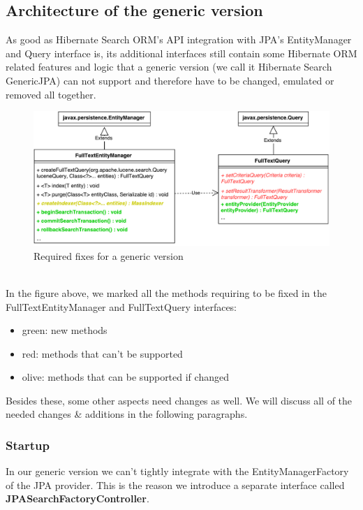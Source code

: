 \pagebreak

\subsection{Architecture of the generic version}

As good as Hibernate Search ORM's API integration with JPA's EntityManager and Query interface is, its additional interfaces still contain some Hibernate ORM related features and logic that a generic version (we call it Hibernate Search GenericJPA) can not support and therefore have to be changed, emulated or removed all together.
\\
\begin{figure}[ht]
	\centering
	\includegraphics[scale=0.6]{images/hibernate_search_jpa_integration_with_differences.pdf}
	\caption{Required fixes for a generic version}
	\label{hibernate_search_jpa_integration_with_differences}
\end{figure}
\\
In the figure above, we marked all the methods requiring to be fixed in the FullTextEntityManager and FullTextQuery interfaces:
\begin{itemize}
	\item green: new methods
	\item red: methods that can't be supported
	\item olive: methods that can be supported if changed
\end{itemize}
\noindent
Besides these, some other aspects need changes as well. We will discuss all of the needed changes \& additions in the following paragraphs.

\pagebreak

\subsubsection{Startup}

In our generic version we can't tightly integrate with the EntityManagerFactory of the JPA provider. This is the reason we introduce a separate interface called \textbf{JPASearchFactoryController}.

